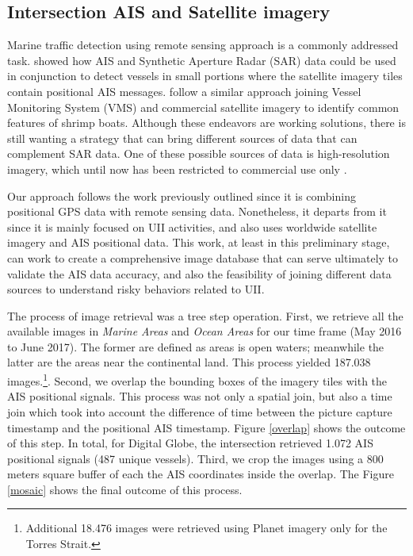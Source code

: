 \subsection{Intersection AIS and Satellite imagery}

Marine traffic detection using remote sensing approach is a commonly addressed task. \cite{Brusch2011} showed how 
AIS and Synthetic Aperture Radar (SAR) data could be used in conjunction to detect vessels in small portions where
the satellite imagery tiles contain positional AIS messages. \cite{Corbane2008} follow a similar approach joining
Vessel Monitoring System (VMS) and commercial satellite imagery to identify common features of shrimp boats. Although
these endeavors are working solutions, there is still wanting a strategy that can bring different sources of data that
can complement SAR data. One of these possible sources of data is high-resolution imagery, which until now has been 
restricted to commercial use only \cite{Greidanus2006}.

Our approach follows the work previously outlined since it is combining positional GPS data with remote sensing data. 
Nonetheless, it departs from it since it is mainly focused on UII activities, and also uses worldwide satellite imagery 
and AIS positional data. This work, at least in this preliminary stage, can work to create a comprehensive image 
database that can serve ultimately to validate the AIS data accuracy, and also the feasibility of joining different 
data sources to understand risky behaviors related to UII. 

The process of image retrieval was a tree step operation. First, we retrieve all the available images in \textit{Marine Areas} and
\textit{Ocean Areas} for our time frame (May 2016 to June 2017). The former are defined as areas is open waters; meanwhile the latter
are the areas near the continental land. This process yielded 187.038 images.\footnote{Additional 18.476 images were retrieved using 
Planet imagery only for the Torres Strait.}. Second, we overlap the bounding boxes of the imagery tiles with the AIS positional signals. 
This process was not only a spatial join, but also a time join which took into account the difference of time between the picture 
capture timestamp and the positional AIS timestamp. Figure \ref{overlap} shows the outcome of this step. In total, for Digital Globe,
the intersection retrieved 1.072 AIS positional signals (487 unique vessels). Third, we crop the images using a 800 meters square buffer 
of each the AIS coordinates inside the overlap. The Figure \ref{mosaic} shows the final outcome of this process.

